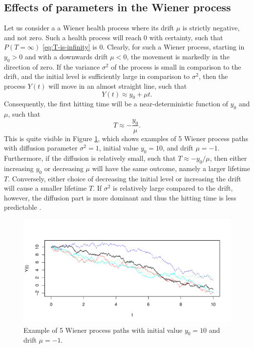 \subsection{Effects of parameters in the Wiener process}
Let us consider a a Wiener health process where its drift $\mu$ is strictly negative, and not zero.
Such a health process will reach 0 with certainty, such that $P(T=\infty)$ \eqref{eq:T-is-infinity} is 0.
Clearly, for such a Wiener process, starting in $y_0>0$ and with a downwards drift $\mu<0$, the movement is markedly in the direction of zero.
If the variance $\sigma^2$ of the process is small in comparison to the drift, and the initial level is sufficiently large in comparison to $\sigma^2$, then the process $Y(t)$ will move in an almost straight line, such that
\begin{equation*}
    Y(t)\approx y_0+\mu t.
\end{equation*}
Consequently, the first hitting time will be a near-deterministic function of $y_0$ and $\mu$, such that
\begin{equation*}
    T\approx -\frac{y_0}{\mu}.
\end{equation*}
This is quite visible in Figure \ref{plot:wiener}, which shows examples of 5 Wiener process paths with diffusion parameter $\sigma^2=1$, initial value $y_0=10$, and drift $\mu=-1$.
Furthermore, if the diffusion is relatively small, such that $T\approx -y_0/\mu$, then either increasing $y_0$ or decreasing $\mu$ will have the same outcome, namely a larger lifetime $T$.
Conversely, either choice of decreasing the initial level or increasing the drift will cause a smaller lifetime $T$.
If $\sigma^2$ is relatively large compared to the drift, however, the diffusion part is more dominant and thus the hitting time is less predictable \citep{ABG}.

\begin{figure}
\label{plot:wiener}
\caption{Example of 5 Wiener process paths with initial value $y_0=10$ and drift $\mu=-1$.}
\centering
\includegraphics[scale=0.4]{figures/wiener_processes.pdf}
\end{figure}

